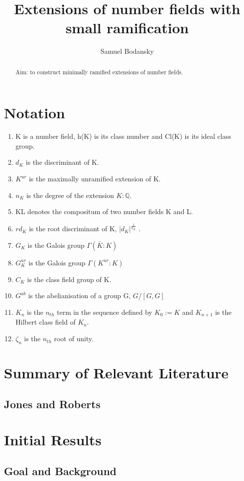 \documentclass[preprint,12pt,leqno]{elsarticle}
\begin{document}
\begin{frontmatter}
\title{Extensions of number fields with small ramification}
\author{Samuel Bodansky}
\address{Oxford,UK}
\begin{abstract}
Aim: to construct minimally ramified extensions of number fields.
\end{abstract}
\end{frontmatter}
\section{Notation}
\begin{enumerate}
    \item K is a number field, h(K) is its class number and Cl(K) is its ideal class group.
    \item $d_K$ is the discriminant of K.
    \item $K^{ur}$ is the maximally unramified extension of K.
    \item $n_K$ is the degree of the extension $K:\mathbb{Q}$.
    \item KL denotes the compositum of two number fields K and L.
    \item $rd_K$ is the root discriminant of K, $|d_K|^\frac{1}{n_K}$ .
    \item $G_K$ is the Galois group $\Gamma(\bar{K}:K)$
    \item $G_K^{ur}$ is the Galois group $\Gamma(K^{ur}:K)$
    \item $C_K$ is the class field group of K. 
    \item $G^{ab}$ is the abelianisation of a group G, $G/[G,G]$
    \item $K_n$ is the $n_{th}$ term in the sequence defined by $K_0:=K$ and $K_{n+1}$ is the Hilbert class field of $K_n$.
    \item $\zeta_n$ is the $n_{th}$ root of unity. 
\end{enumerate}
\section{Summary of Relevant Literature}
\subsection{Jones and Roberts}

\section{Initial Results}
\subsection{Goal and Background}
\end{document}
